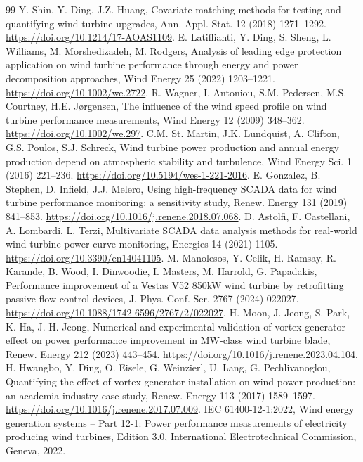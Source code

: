 \documentclass[preprint,12pt]{elsarticle}
\begin{document}
\begin{thebibliography}{99}
 Y. Shin, Y. Ding, J.Z. Huang, Covariate matching methods for testing and quantifying wind turbine upgrades, Ann. Appl. Stat. 12 (2018) 1271--1292. \url{https://doi.org/10.1214/17-AOAS1109}.
 E. Latiffianti, Y. Ding, S. Sheng, L. Williams, M. Morshedizadeh, M. Rodgers, Analysis of leading edge protection application on wind turbine performance through energy and power decomposition approaches, Wind Energy 25 (2022) 1203--1221. \url{https://doi.org/10.1002/we.2722}.
 R. Wagner, I. Antoniou, S.M. Pedersen, M.S. Courtney, H.E. Jørgensen, The influence of the wind speed profile on wind turbine performance measurements, Wind Energy 12 (2009) 348--362. \url{https://doi.org/10.1002/we.297}.
 C.M. St. Martin, J.K. Lundquist, A. Clifton, G.S. Poulos, S.J. Schreck, Wind turbine power production and annual energy production depend on atmospheric stability and turbulence, Wind Energy Sci. 1 (2016) 221--236. \url{https://doi.org/10.5194/wes-1-221-2016}.
 E. Gonzalez, B. Stephen, D. Infield, J.J. Melero, Using high-frequency SCADA data for wind turbine performance monitoring: a sensitivity study, Renew. Energy 131 (2019) 841--853. \url{https://doi.org/10.1016/j.renene.2018.07.068}.
 D. Astolfi, F. Castellani, A. Lombardi, L. Terzi, Multivariate SCADA data analysis methods for real-world wind turbine power curve monitoring, Energies 14 (2021) 1105. \url{https://doi.org/10.3390/en14041105}.
 M. Manolesos, Y. Celik, H. Ramsay, R. Karande, B. Wood, I. Dinwoodie, I. Masters, M. Harrold, G. Papadakis, Performance improvement of a Vestas V52 850kW wind turbine by retrofitting passive flow control devices, J. Phys. Conf. Ser. 2767 (2024) 022027. \url{https://doi.org/10.1088/1742-6596/2767/2/022027}.
 H. Moon, J. Jeong, S. Park, K. Ha, J.-H. Jeong, Numerical and experimental validation of vortex generator effect on power performance improvement in MW-class wind turbine blade, Renew. Energy 212 (2023) 443--454. \url{https://doi.org/10.1016/j.renene.2023.04.104}.
 H. Hwangbo, Y. Ding, O. Eisele, G. Weinzierl, U. Lang, G. Pechlivanoglou, Quantifying the effect of vortex generator installation on wind power production: an academia-industry case study, Renew. Energy 113 (2017) 1589--1597. \url{https://doi.org/10.1016/j.renene.2017.07.009}.
 IEC 61400-12-1:2022, Wind energy generation systems -- Part 12-1: Power performance measurements of electricity producing wind turbines, Edition 3.0, International Electrotechnical Commission, Geneva, 2022.

\end{thebibliography}
\end{document}
